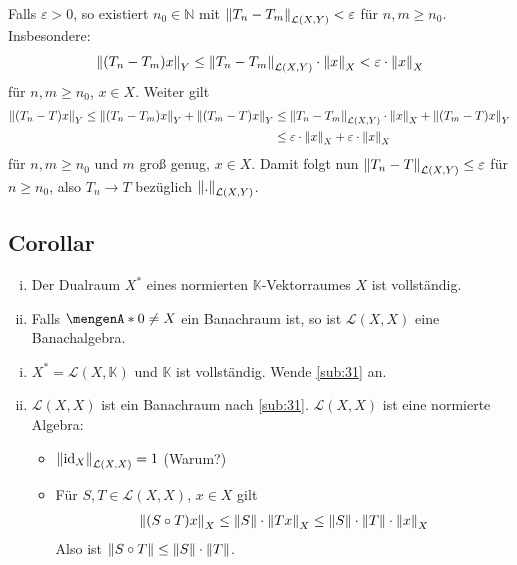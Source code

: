 \noindent Falls $\varepsilon >0$, so existiert $n_0 \in \mathds{N}$ mit $\norm[\mathcal{L}(X,Y)]{T_n - T_m}  < \varepsilon$ für $n,m \ge n_0$. Insbesondere: 
\begin{align*}
	\norm[Y]{(T_n- T_m)x} \le \norm[\mathcal{L}(X,Y)]{T_n -T_m} \cdot \norm[X]{x} < \varepsilon \cdot \norm[X]{x}    
\end{align*}
für $n,m \ge n_0$, $x \in X$. Weiter gilt 
\begin{align*}
	\norm[Y]{(T_n- T)x} \le \norm[Y]{(T_n - T_m)x} + \norm[Y]{(T_m-T)x} &\le \norm[\mathcal{L}(X,Y)]{T_n - T_m} \cdot \norm[X]{x} + \norm[Y]{(T_m-T)x} \\
	&\le \varepsilon \cdot \norm[X]{x} + \varepsilon \cdot \norm[X]{x}  
\end{align*}
für $n,m \ge n_0$ und $m$ groß genug, $x \in X$. Damit folgt nun
$\norm[\mathcal{L}(X,Y)]{T_n -T} \le \varepsilon$ für$n \ge n_0$, also $T_n \to T$ bezüglich $\norm[\mathcal{L}(X,Y)]{.}$. \bewende

\subsection[Corollar: Der Dualraum ist vollständig, $\mathcal{L}(X,X)$ ist Banachalgebra, falls $X$ Banachraum ist]{Corollar} %
\label{sub:32}
\begin{enumerate}[(i)]
	\item Der Dualraum $X^*$ eines normierten $\mathds{K}$-Vektorraumes $X$ ist vollständig. 
	\item Falls $\set{0} \not= X$ ein Banachraum ist, so ist $\mathcal{L}(X,X)$ eine Banachalgebra.
\end{enumerate}
\begin{enumerate}[(i)]
	\item $X^*=\mathcal{L}(X,\mathds{K})$ und $\mathds{K}$ ist vollständig. Wende \ref{sub:31} an.
	\item $\mathcal{L}(X,X)$ ist ein Banachraum nach \ref{sub:31}. $\mathcal{L}(X,X)$ ist eine normierte Algebra: 
	\begin{itemize}
		\item $\norm[\mathcal{L}(X,X)]{\id_X}=1$ \hfill (Warum?)
		\item Für $S,T \in \mathcal{L}(X,X)$, $x \in X$ gilt
		\begin{align*}
			\norm[X]{(S \circ T)x} \le \norm{S} \cdot \norm[X]{T x} \le \norm{S} \cdot \norm{T} \cdot \norm[X]{x}   
		\end{align*}
		Also ist $\norm{S \circ T} \le \norm{S} \cdot \norm{T}$. \bewende
	\end{itemize}
\end{enumerate}

